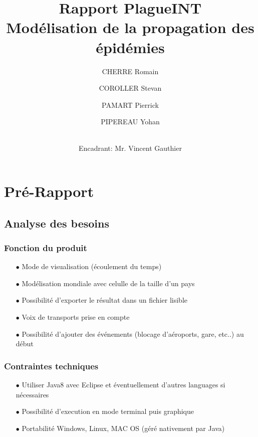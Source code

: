 \documentclass[12pt,a4paper]{report}
\title{ \Huge \textbf{Rapport PlagueINT} \\ \large Modélisation de la propagation des épidémies}
\author{
CHERRE Romain
\and COROLLER Stevan 
\and PAMART Pierrick
\and PIPEREAU Yohan
\and \\
Encadrant: Mr. Vincent Gauthier }
\begin{document}
\maketitle

\tableofcontents

\newpage

\chapter*{Pré-Rapport}

\section*{Analyse des besoins}

\subsection*{Fonction du produit}
\begin{flushleft}
  \begin{itemize}
	\item[$\bullet$] Mode de visualisation (écoulement du temps) 
	\item[$\bullet$] Modélisation mondiale avec celulle de la taille d'un pays
	\item[$\bullet$] Possibilité d'exporter le résultat dans un fichier lisible 
	\item[$\bullet$] Voix de transports prise en compte 
	\item[$\bullet$] Possibilité d'ajouter des événements (blocage d'aéroports, gare, etc..) au début
  \end{itemize}
\end{flushleft}

\subsection*{Contraintes techniques}
\begin{flushleft}
  \begin{itemize}
	\item[$\bullet$] Utiliser Java8 avec Eclipse et éventuellement d'autres languages si nécessaires 
	\item[$\bullet$] Possibilité d'execution en mode terminal puis graphique
	\item[$\bullet$] Portabilité Windows, Linux, MAC OS (géré nativement par Java)
    \end{itemize}
\end{flushleft}
\end{document}
